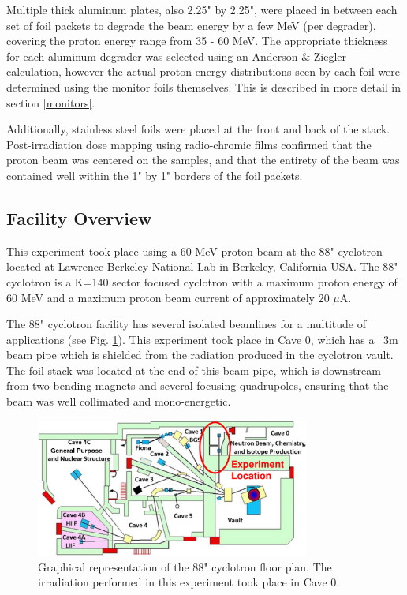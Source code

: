 \documentclass[aps,twocolumn,secnumarabic,balancelastpage,amsmath,amssymb,nofootinbib,floatfix]{revtex4-1}
\begin{document}
Multiple thick aluminum plates, also 2.25" by 2.25", were placed in between each set of foil packets to degrade the beam energy by a few MeV (per degrader), covering the proton energy range from 35 - 60 MeV.  The appropriate thickness for each aluminum degrader was selected using an Anderson \& Ziegler calculation, however the actual proton energy distributions seen by each foil were determined using the monitor foils themselves.  This is described in more detail in section \ref{monitors}.

Additionally, stainless steel foils were placed at the front and back of the stack.  Post-irradiation dose mapping using radio-chromic films confirmed that the proton beam was centered on the samples, and that the entirety of the beam was contained well within the 1" by 1" borders of the foil packets.

\subsection{Facility Overview}
This experiment took place using a 60 MeV proton beam at the 88" cyclotron located at Lawrence Berkeley National Lab in Berkeley, California USA.  The 88" cyclotron is a K=140 sector focused cyclotron with a maximum proton energy of 60 MeV and a maximum proton beam current of approximately 20 $\mu$A.

The 88" cyclotron facility has several isolated beamlines for a multitude of applications (see Fig. \ref{fig:cyclotron}).  This experiment took place in Cave 0, which has a ~3m beam pipe which is shielded from the radiation produced in the cyclotron vault.  The foil stack was located at the end of this beam pipe, which is downstream from two bending magnets and several focusing quadrupoles, ensuring that the beam was well collimated and mono-energetic.

\begin{figure}[htb]
\includegraphics[width=9cm]{photos/cyclotron.png}
\caption{Graphical representation of the 88" cyclotron floor plan.  The irradiation performed in this experiment took place in Cave 0.
}
\label{fig:cyclotron}
\end{figure}
\end{document}
